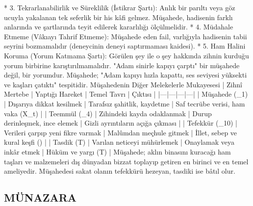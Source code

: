 \documentclass[11pt,a4paper]{article}
\begin{document}
 * 3. Tekrarlanabilirlik ve Süreklilik (İstikrar Şartı):
   Anlık bir parıltı veya göz ucuyla yakalanan tek seferlik bir his kâfi gelmez. Müşahede, hadisenin farklı anlarında ve şartlarında teyit edilerek kararlılığı ölçülmelidir.
 * 4. Müdahale Etmeme (Vâkıayı Tahrif Etmeme):
   Müşahede eden fail, varlığıyla hadisenin tabii seyrini bozmamalıdır (deneycinin deneyi saptırmaması kaidesi).
 * 5. Ham Halini Koruma (Yorum Katmama Şartı):
   Görülen şey ile o şey hakkında zihnin kurduğu yorum birbirine karıştırılmamalıdır. "Adam sinirle kapıyı çarptı" bir müşahede değil, bir yorumdur. Müşahede; "Adam kapıyı hızla kapattı, ses seviyesi yüksekti ve kaşları çatıktı" tespitidir.
Müşahedenin Diğer Melekelerle Mukayesesi
| Zihnî Mertebe | Yaptığı Hareket | Temel Tavrı | Çıktısı |
|---|---|---|---|
| Müşahede (_1) | Dışarıya dikkat kesilmek | Tarafsız şahitlik, kaydetme | Saf tecrübe verisi, ham vaka (X_t) |
| Teemmül (_4) | Zihindeki kayda odaklanmak | Durup derinleşmek, ince elemek | Gizli ayrıntıların açığa çıkması |
| Tefekkür (_{10}) | Verileri çarpıp yeni fikre varmak | Malûmdan meçhule gitmek | İllet, sebep ve kural keşfi () |
| Tasdik (T) | Varılan neticeyi mühürlemek | Onaylamak veya inkâr etmek | Hüküm ve yargı (T) |
Müşahede; aklın binasını kuracağı ham taşları ve malzemeleri dış dünyadan bizzat toplayıp getiren en birinci ve en temel ameliyedir. Müşahedesi sakat olanın tefekkürü hezeyan, tasdiki ise bâtıl olur.






\subsection{MÜNAZARA}
\end{document}
